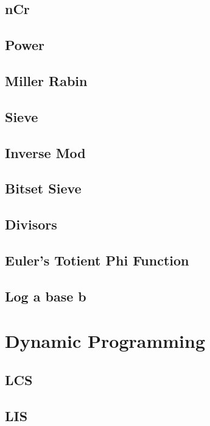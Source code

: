 \documentclass[10pt, a4paper]{article}
\begin{document}
\begin{multicols}{2}
\subsection{nCr}


\subsection{Power}


\subsection{Miller Rabin}


\subsection{Sieve}


\subsection{Inverse Mod}


\subsection{Bitset Sieve}


\subsection{Divisors}


\subsection{Euler's Totient Phi Function}


\subsection{Log a base b}


\section{Dynamic Programming}
\subsection{LCS}


\subsection{LIS}


\end{multicols}
\end{document}

